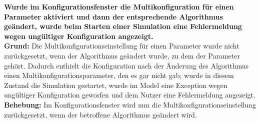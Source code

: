 \documentclass[parskip=full,11pt,openany]{scrreprt}
\begin{document}
\textbf{Wurde im Konfigurationsfenster die Multikonfiguration für einen Parameter aktiviert und dann der entsprechende Algorithmus geändert, wurde beim Starten einer Simulation eine Fehlermeldung wegen ungültiger Konfiguration angezeigt.}\\
\textbf{Grund: } Die Multikonfigurationseinstellung für einen Parameter wurde nicht zurückgesetzt, wenn der Algorithmus geändert wurde, zu dem der Parameter gehört. Dadurch enthielt die Konfiguration nach der Änderung des Algorithmus einen Multikonfigurationsparameter, den es gar nicht gab; wurde in diesem Zustand die Simulation gestartet, wurde im Model eine Exception wegen ungültiger Konfiguration geworfen und dem Nutzer eine Fehlermeldung angezeigt.\\
\textbf{Behebung:} Im Konfigurationsfenster wird nun die Multikonfigurationseinstellung zurückgesetzt, wenn der betroffene Algorithmus geändert wird.
\end{document}
